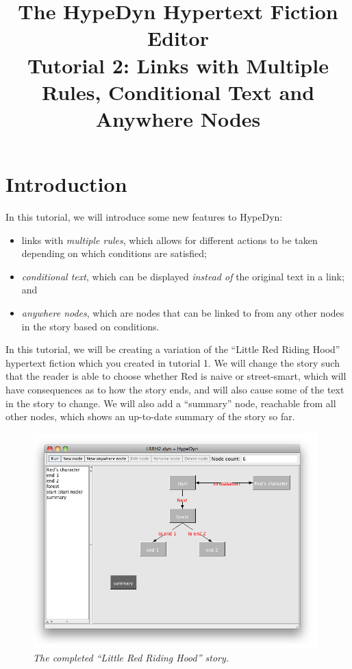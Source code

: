 \documentclass{article}
\begin{document}
\title{The HypeDyn Hypertext Fiction Editor\\Tutorial 2: Links with Multiple
Rules, Conditional Text and Anywhere Nodes}
\date{}

\onecolumn
\maketitle

\tableofcontents


\section{Introduction}
In this tutorial, we will introduce some new features to HypeDyn:

\begin{itemize}
  \item links with \textit{multiple rules}, which allows for different actions
  to be taken depending on which conditions are satisfied;
  \item \textit{conditional text}, which can be displayed \textit{instead of}
  the original text in a link; and \item \textit{anywhere nodes}, which are
  nodes that can be linked to from any other nodes in the story based on
  conditions.
\end{itemize}

In this tutorial, we will be creating a variation of the ``Little Red Riding
Hood'' hypertext fiction which you created in tutorial 1. We will change the
story such that the reader is able to choose whether Red is naive or
street-smart, which will have consequences as to how the story ends, and will
also cause some of the text in the story to change. We will also add a
``summary'' node, reachable from all other nodes, which shows an up-to-date
summary of the story so far.

\begin{figure}[h]
  \centering
  \includegraphics[width=11cm]{images/hypedyn-tutorial-2-figure-1}
  \caption{\textit{The completed ``Little Red Riding Hood'' story.}}
  \label{fig:tut2:completed}
\end{figure} 
\end{document}
